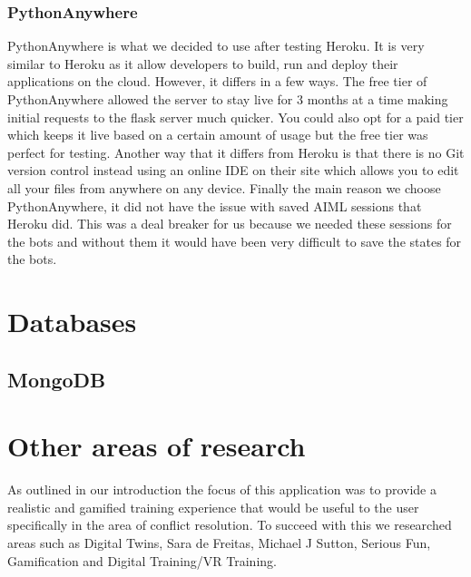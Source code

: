 \subsubsection{PythonAnywhere}
PythonAnywhere is what we decided to use after testing Heroku. It is very similar to Heroku as it allow developers to build, run and deploy their applications on the cloud. However, it differs in a few ways. The free tier of PythonAnywhere allowed the server to stay live for 3 months at a time making initial requests to the flask server much quicker. You could also opt for a paid tier which keeps it live based on a certain amount of usage but the free tier was perfect for testing. Another way that it differs from Heroku is that there is no Git version control instead using an online IDE on their site which allows you to edit all your files from anywhere on any device. Finally the main reason we choose PythonAnywhere, it did not have the issue with saved AIML sessions that Heroku did. This was a deal breaker for us because we needed these sessions for the bots and without them it would have been very difficult to save the states for the bots. 

\section{Databases}
\subsection{MongoDB}

\section{Other areas of research}
As outlined in our introduction the focus of this application was to provide a realistic and gamified training experience that would be useful to the user specifically in the area of conflict resolution. To succeed with this we researched areas such as Digital Twins, Sara de Freitas, Michael J Sutton, Serious Fun, Gamification and Digital Training/VR Training.